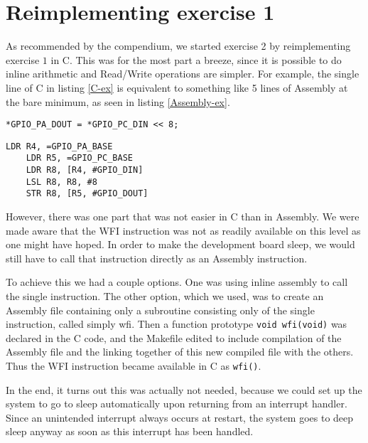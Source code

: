\section{Reimplementing exercise 1}

As recommended by the compendium, we started exercise 2 by reimplementing exercise $1$ in C. This was for the most part a breeze, since it is possible to do inline arithmetic and Read/Write operations are simpler. For example, the single line of C in listing \ref{C-ex} is equivalent to something like 5 lines of Assembly at the bare minimum, as seen in listing \ref{Assembly-ex}.

\begin{lstlisting}[label=C-ex,caption=BAR]
    *GPIO_PA_DOUT = *GPIO_PC_DIN << 8;
\end{lstlisting}

\begin{lstlisting}[label=Assembly-ex,caption=BAR]
	LDR R4, =GPIO_PA_BASE
	LDR R5, =GPIO_PC_BASE
	LDR R8, [R4, #GPIO_DIN]
	LSL R8, R8, #8
	STR R8, [R5, #GPIO_DOUT]
\end{lstlisting}

However, there was one part that was not easier in C than in Assembly. We were made aware that the WFI instruction was not as readily available on this level as one might have hoped. In order to make the development board sleep, we would still have to call that instruction directly as an Assembly instruction.

To achieve this we had a couple options. One was using inline assembly to call the single instruction. The other option, which we used, was to create an Assembly file containing only a subroutine consisting only of the single instruction, called simply wfi. Then a function prototype \texttt{void wfi(void)} was declared in the C code, and the Makefile edited to include compilation of the Assembly file and the linking together of this new compiled file with the others. Thus the WFI instruction became available in C as \texttt{wfi()}.

In the end, it turns out this was actually not needed, because we could set up the system to go to sleep automatically upon returning from an interrupt handler. Since an unintended interrupt always occurs at restart, the system goes to deep sleep anyway as soon as this interrupt has been handled.
